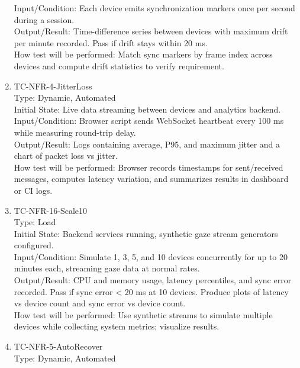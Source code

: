 \documentclass[12pt, titlepage]{article}
\begin{document}
\begin{enumerate}
Input/Condition: Each device emits synchronization markers once per second during a session.\\

Output/Result: Time-difference series between devices with maximum drift per minute recorded. Pass if drift stays within 20 ms.\\

How test will be performed: Match sync markers by frame index across devices and compute drift statistics to verify requirement.

\item{TC-NFR-4-JitterLoss\\}
Type: Dynamic, Automated\\

Initial State: Live data streaming between devices and analytics backend.\\

Input/Condition: Browser script sends WebSocket heartbeat every 100 ms while measuring round-trip delay.\\

Output/Result: Logs containing average, P95, and maximum jitter and a chart of packet loss vs jitter.\\

How test will be performed: Browser records timestamps for sent/received messages, computes latency variation, and summarizes results in dashboard or CI logs.

\item{TC-NFR-16-Scale10\\}
Type: Load\\

Initial State: Backend services running, synthetic gaze stream generators configured.\\

Input/Condition: Simulate 1, 3, 5, and 10 devices concurrently for up to 20 minutes each, streaming gaze data at normal rates.\\

Output/Result: CPU and memory usage, latency percentiles, and sync error recorded. Pass if sync error < 20 ms at 10 devices. Produce plots of latency vs device count and sync error vs device count.\\

How test will be performed: Use synthetic streams to simulate multiple devices while collecting system metrics; visualize results.

\item{TC-NFR-5-AutoRecover\\}
Type: Dynamic, Automated\\


\end{enumerate}
\end{document}
